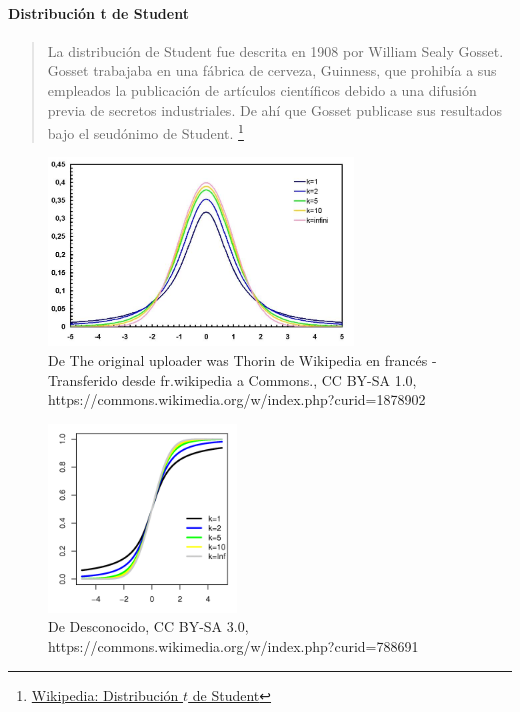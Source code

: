 \paragraph{Distribución t de Student}
\begin{quote}
 La distribución de Student fue descrita en 1908 por William Sealy Gosset. Gosset trabajaba en una fábrica de cerveza, Guinness, que prohibía a sus empleados la publicación de artículos científicos debido a una difusión previa de secretos industriales. De ahí que Gosset publicase sus resultados bajo el seudónimo de Student. \footnote{
\href{https://es.wikipedia.org/wiki/Distribuci\%C3\%B3n\_t\_de\_Student\#Historia}{Wikipedia: Distribución $t$ de Student}
}
\end{quote}


\begin{figure}[h]
 \centering
 \includegraphics[height=5cm,keepaspectratio=true]{./images/Student_densite_best.jpg}
 \caption{De The original uploader was Thorin de Wikipedia en francés - Transferido desde fr.wikipedia a Commons., CC BY-SA 1.0, https://commons.wikimedia.org/w/index.php?curid=1878902}
 \label{fig:tPDF}
\end{figure}




 \begin{figure}[h]
 \centering
 \includegraphics[height=5cm,keepaspectratio=true]{./images/T_distributionCDF.png}
 \caption{De Desconocido, CC BY-SA 3.0, https://commons.wikimedia.org/w/index.php?curid=788691}
 \label{fig:tCDF}
\end{figure}

